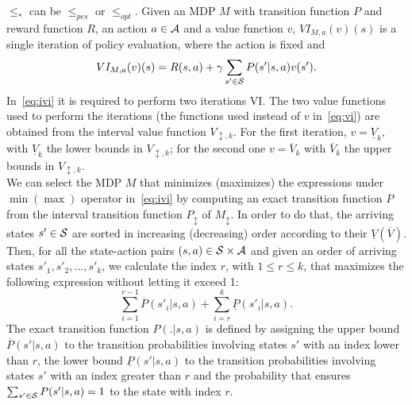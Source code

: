 $\leq_{*}$ can be $\leq_{pes}$ or $\leq_{opt}$. Given an \ac{MDP} $M$ with transition function $P$ and reward function $R$, an action $a \in \mathcal{A}$ and a value function $v$, $VI_{M, a}(v)(s)$ is a single iteration of policy evaluation, where the action is fixed and 
\begin{align} 
VI_{M, a}(v)(s) = R(s,a) + \gamma \sum_{s' \in \mathcal{S}} P(s'|s,a)v(s'). \label{eq:vi}
\end{align}
In~\eqref{eq:ivi} it is required to perform two iterations VI. The two value functions used to perform the iterations (\ie the functions used instead of $v$ in~\eqref{eq:vi}) are obtained from the interval value function $V_{\updownarrow, k}$. For the first iteration, $v = \underline{V}_{k}$, with $\underline{V}_{k}$ the lower bounds in $V_{\updownarrow, k}$; for the second one $v = \overline{V}_{k}$ with $\overline{V}_{k}$ the upper bounds in $V_{\updownarrow, k}$.\\
\newline
We can select the \ac{MDP} $M$ that minimizes (maximizes) the expressions under $\min (\max)$ operator in~\eqref{eq:ivi} by computing an exact transition function $P$ from the interval transition function $P_{\updownarrow}$ of $M_{\updownarrow}$. In order to do that, the arriving states $s' \in \mathcal{S}$ are sorted in increasing (decreasing) order according to their $\underline{V}(\overline{V})$. Then, for all the state-action pairs $(s,a) \in \mathcal{S} \times \mathcal{A}$ and given an order of arriving states $s'_1, s'_2, ..., s'_k$, we calculate the index $r$, with $1 \leq r \leq k$, that maximizes the following expression without letting it exceed 1:
$$\sum_{i=1}^{r-1}\overline{P}(s'_i|s,a) + \sum_{i=r}^{k}\underline{P}(s'_i|s,a).$$
The exact transition function $P(.|s,a)$ is defined by assigning the upper bound $\overline{P}(s'|s,a)$ to the transition probabilities involving states $s'$ with an index lower than $r$, the lower bound $\underline{P}(s'|s,a)$ to the transition probabilities involving states $s'$ with an index greater than $r$ and the probability that ensures $\sum_{s' \in \mathcal{S}}P(s'|s,a) = 1$ to the state with index $r$.

